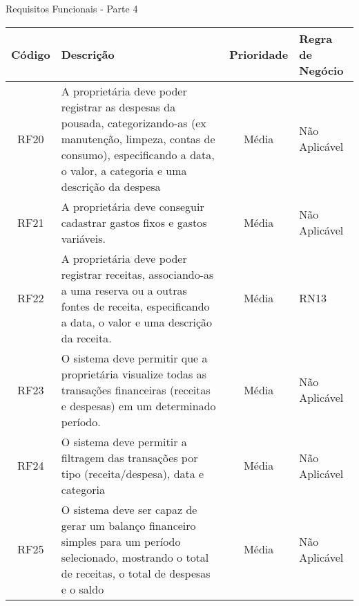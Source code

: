 \documentclass[
	12pt,				%
	openany,			%
	twoside,			%
	a4paper,			%
	english,			%
	french,				%
	spanish,			%
	brazil				%
	]{abntex2}
\begin{document}
\begin{quadro}[H]
	\caption{Requisitos Funcionais - Parte 4}
	\label{quadro_rf4}
	\begin{tabular}{|c|p{5cm}|c|p{4cm}|}
		\hline
		\textbf{Código} & \textbf{Descrição} & \textbf{Prioridade} & \textbf{Regra de Negócio} \\ \hline
		RF20 & A proprietária deve poder registrar as despesas da pousada, categorizando-as (ex manutenção, limpeza, contas de consumo), especificando a data, o valor, a categoria e uma descrição da despesa & Média & Não Aplicável \\ \hline
		RF21 & A proprietária deve conseguir cadastrar gastos fixos e gastos variáveis. & Média & Não Aplicável \\ \hline
		RF22 & A proprietária deve poder registrar receitas, associando-as a uma reserva ou a outras fontes de receita, especificando a data, o valor e uma descrição da receita. & Média & RN13 \\ \hline
		RF23 & O sistema deve permitir que a proprietária visualize todas as transações financeiras (receitas e despesas) em um determinado período. & Média & Não Aplicável \\ \hline
		RF24 & O sistema deve permitir a filtragem das transações por tipo (receita/despesa), data e categoria & Média & Não Aplicável \\ \hline
		RF25 & O sistema deve ser capaz de gerar um balanço financeiro simples para um período selecionado, mostrando o total de receitas, o total de despesas e o saldo & Média & Não Aplicável \\ \hline
	\end{tabular}

\end{quadro}
\end{document}
